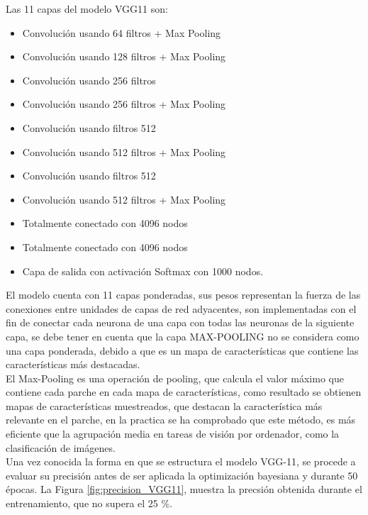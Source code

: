 Las 11 capas del modelo VGG11 son:
\begin{itemize}
	\item Convolución usando 64 filtros + Max Pooling
	\item Convolución usando 128 filtros + Max Pooling
	\item Convolución usando 256 filtros
	\item Convolución usando 256 filtros + Max Pooling
	\item Convolución usando filtros 512
	\item Convolución usando 512 filtros + Max Pooling
	\item Convolución usando filtros 512
	\item Convolución usando 512 filtros + Max Pooling
	\item Totalmente conectado con 4096 nodos
	\item Totalmente conectado con 4096 nodos
	\item Capa de salida con activación Softmax con 1000 nodos.
\end{itemize}

El modelo cuenta con 11 capas ponderadas, sus pesos representan la fuerza de las conexiones entre unidades de capas de red adyacentes, son implementadas con el fin de conectar cada neurona de una capa con todas las neuronas de la siguiente capa, se debe tener en cuenta que la capa MAX-POOLING no se considera como una capa ponderada, debido a que es un mapa de características que contiene las características más destacadas.\\

El Max-Pooling es una operación de pooling, que calcula el valor máximo que contiene cada parche en cada mapa de características, como resultado se obtienen mapas de características muestreados, que destacan la característica más relevante en el parche, en la practica se ha comprobado que este método, es más eficiente que la agrupación media en tareas de visión por ordenador, como la clasificación de imágenes.\\		 


Una vez conocida la forma en que se estructura el modelo VGG-11, se procede a evaluar su precisión antes de ser aplicada la optimización bayesiana y durante 50 épocas. La Figura \ref{fig:precision_VGG11}, muestra la precsión obtenida durante el entrenamiento, que no supera el 25 \%.



